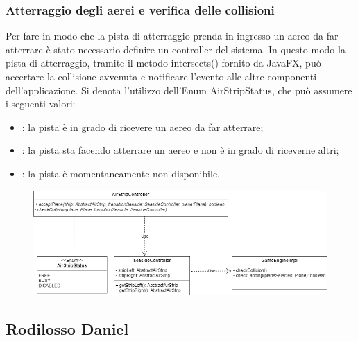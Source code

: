 \documentclass[a4paper,12pt]{report}
\begin{document}
\subsubsection{Atterraggio degli aerei e verifica delle collisioni}
Per fare in modo che la pista di atterraggio prenda in ingresso un aereo da far atterrare è stato necessario definire un controller del sistema. In questo modo la pista di atterraggio, tramite il metodo intersects() fornito da JavaFX, può accertare la collisione avvenuta e notificare l’evento alle altre componenti dell’applicazione. Si denota l’utilizzo dell’Enum AirStripStatus, che può assumere i seguenti valori:
\begin{itemize}
    \item {}: la pista è in grado di ricevere un aereo da far atterrare;
    \item {}: la pista sta facendo atterrare un aereo e non è in grado di riceverne altri;
    \item {}: la pista è momentaneamente non disponibile.
\end{itemize}
\begin{figure}[H]
    \begin{center}
        \centering
        \includegraphics[width=\textwidth]{img/Design/Foschi/AirStripController.png}
    \end{center}
    \label{img:airstrip-controller}
\end{figure}

\clearpage

\subsection{Rodilosso Daniel}
\end{document}
